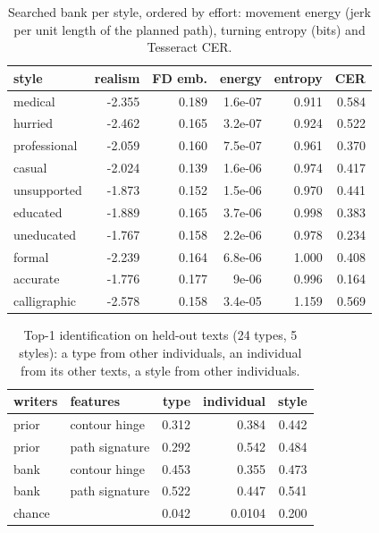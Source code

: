 \begin{table}[t]\centering\small\setlength\tabcolsep{3pt}
\begin{tabular}{lrrrrr}\toprule style & realism & FD emb. & energy & entropy & CER\\\midrule
medical & -2.355 & 0.189 & 1.6e-07 & 0.911 & 0.584\\
hurried & -2.462 & 0.165 & 3.2e-07 & 0.924 & 0.522\\
professional & -2.059 & 0.160 & 7.5e-07 & 0.961 & 0.370\\
casual & -2.024 & 0.139 & 1.6e-06 & 0.974 & 0.417\\
unsupported & -1.873 & 0.152 & 1.5e-06 & 0.970 & 0.441\\
educated & -1.889 & 0.165 & 3.7e-06 & 0.998 & 0.383\\
uneducated & -1.767 & 0.158 & 2.2e-06 & 0.978 & 0.234\\
formal & -2.239 & 0.164 & 6.8e-06 & 1.000 & 0.408\\
accurate & -1.776 & 0.177 & 9e-06 & 0.996 & 0.164\\
calligraphic & -2.578 & 0.158 & 3.4e-05 & 1.159 & 0.569\\
\bottomrule\end{tabular}
\caption{Searched bank per style, ordered by effort: movement energy (jerk per unit length of the planned path), turning entropy (bits) and Tesseract CER.}
\label{tab:styles}\end{table}

\begin{table}[t]\centering\small\setlength\tabcolsep{3pt}
\begin{tabular}{llrrr}\toprule writers & features & type & individual & style\\\midrule
prior & contour hinge & 0.312 & 0.384 & 0.442\\
prior & path signature & 0.292 & 0.542 & 0.484\\
bank & contour hinge & 0.453 & 0.355 & 0.473\\
bank & path signature & 0.522 & 0.447 & 0.541\\
chance & & 0.042 & 0.0104 & 0.200\\
\bottomrule\end{tabular}
\caption{Top-1 identification on held-out texts (24 types, 5 styles): a type from other individuals, an individual from its other texts, a style from other individuals.}
\label{tab:dist}\end{table}

